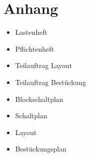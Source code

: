 \section{Anhang}

\begin{itemize}
	\item{Lastenheft}
	
	\item{Pflichtenheft}
	
	\item{Teilauftrag Layout}
	
	\item{Teilauftrag Bestückung}
	
	\item{Blockschaltplan}
	
	\item{Schaltplan}
	
	\item{Layout}
	
	\item{Bestückungsplan}
\end{itemize}



